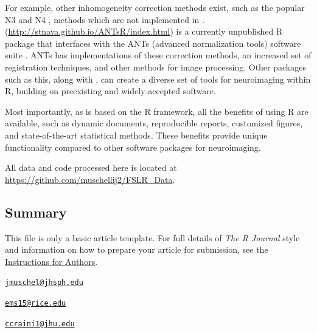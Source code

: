 For example, other inhomogeneity correction methods exist, such as the
popular N3 \citep{sled_nonparametric_1998} and N4
\citep{tustison_n4itk:_2010}, methods which are not implemented in
.  (\url{http://stnava.github.io/ANTsR/index.html})
is a currently unpublished R package that interfaces with the ANTs
(advanced normalization tools) software suite
\citep{avants_reproducible_2011}. ANTs has implementations of these
correction methods, an increased set of registration techniques, and
other methods for image processing. Other packages such as this, along
with , can create a diverse set of tools for neuroimaging
within R, building on preexisting and widely-accepted software.

Most importantly, as  is based on the R framework, all the
benefits of using R are available, such as dynamic documents,
reproducible reports, customized figures, and state-of-the-art
statistical methods. These benefits provide unique functionality
compared to other software packages for neuroimaging.

All data and code processed here is located at
\url{https://github.com/muschellij2/FSLR_Data}.

\subsection{Summary}\label{summary}

This file is only a basic article template. For full details of
\emph{The R Journal} style and information on how to prepare your
article for submission, see the
\href{https://journal.r-project.org/share/author-guide.pdf}{Instructions
for Authors}. 

\address{%
John Muschelli\\
Johns Hopkins Bloomberg School of Public Health\\
Department of Biostatistics\\ 615 N Wolfe St, Baltimore, MD, 21205\\
}
\href{mailto:jmuschel@jhsph.edu}{\nolinkurl{jmuschel@jhsph.edu}}

\address{%
Elizabeth M. Sweeney\\
Rice University\\
Department of Statistics\\ 6100 Main St, Duncan Hall, Houston, TX, 77005\\
}
\href{mailto:ems15@rice.edu}{\nolinkurl{ems15@rice.edu}}

\address{%
Ciprian M. Crainiceanu\\
Johns Hopkins Bloomberg School of Public Health\\
Department of Biostatistics\\ 615 N Wolfe St, Baltimore, MD, 21205\\
}
\href{mailto:ccraini1@jhu.edu}{\nolinkurl{ccraini1@jhu.edu}}

